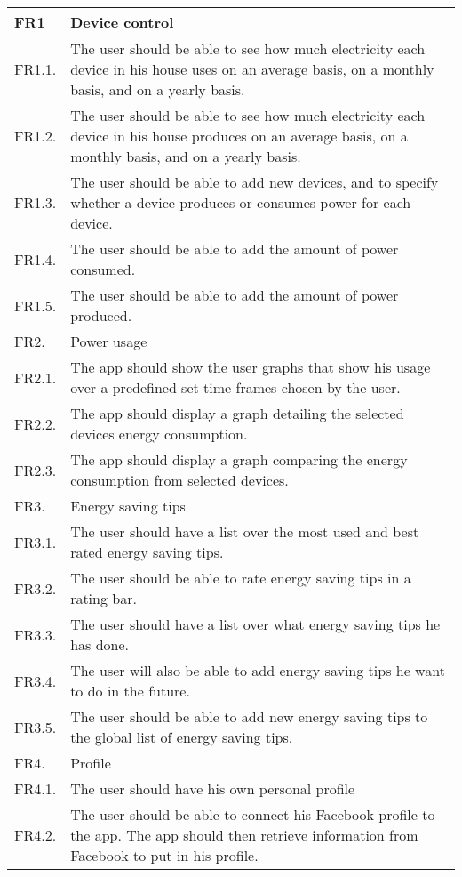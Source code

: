 \begin{longtable}{|l|p{14.5cm}|}
\hline
\cellcolor{lightgray}FR1 & \cellcolor{lightgray}Device control\\\hline
FR1.1. &The user should be able to see how much electricity each device in his house uses on an average basis, on a monthly basis, and on a yearly basis.\\\hline
FR1.2. &The user should be able to see how much electricity each device in his house produces on an average basis, on a monthly basis, and on a yearly basis.\\\hline
FR1.3. &The user should be able to add new devices, and to specify whether a device produces or consumes power for each device.\\\hline
FR1.4. &The user should be able to add the amount of power consumed.\\\hline
FR1.5. &The user should be able to add the amount of power produced.\\\hline
\cellcolor{lightgray}FR2. &\cellcolor{lightgray}Power usage\\\hline
FR2.1.& The app should show the user graphs that show his usage over a predefined set time frames chosen by the user.\\\hline
FR2.2.& The app should display a graph detailing the selected devices energy consumption.\\\hline
FR2.3.& The app should display a graph comparing the energy consumption from selected devices.\\\hline
\cellcolor{lightgray}FR3. &\cellcolor{lightgray}Energy saving tips\\\hline
FR3.1. &The user should have a list over the most used and best rated energy saving tips.\\\hline
FR3.2. &The user should be able to rate energy saving tips in a rating bar.\\\hline
FR3.3. &The user should have a list over what energy saving tips he has done.\\\hline
FR3.4. &The user will also be able to add energy saving tips he want to do in the future.\\\hline
FR3.5. &The user should be able to add new energy saving tips to the global list of energy saving tips.\\\hline
\cellcolor{lightgray}FR4.& \cellcolor{lightgray}Profile\\\hline
FR4.1. &The user should have his own personal profile\\\hline
FR4.2. &The user should be able to connect his Facebook profile to the app. The app should then retrieve information from Facebook to put in his profile.\\\hline

\end{longtable}
